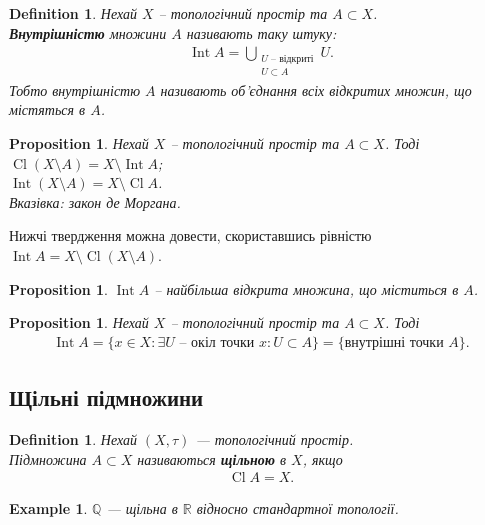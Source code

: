 \documentclass[a4paper, 10pt]{article}
\theoremstyle{theoremdd}
\newtheorem{definition}[theorem]{Definition}
\newtheorem{example}[theorem]{Example}
\newtheorem{proposition}[theorem]{Proposition}
\DeclareMathOperator{\Cl}{Cl}
\DeclareMathOperator{\Int}{Int}
\begin{document}
\begin{definition}
Нехай $X$ -- топологічний простір та $A \subset X$.\\
\textbf{Внутрішністю} множини $A$ називають таку штуку:
\begin{align*}
\Int A = \bigcup_{\substack{\text{$U$ -- відкриті} \\ U \subset A}} U.
\end{align*}
Тобто внутрішністю $A$ називають об'єднання всіх відкритих множин, що містяться в $A$.
\end{definition}

\begin{proposition}
Нехай $X$ -- топологічний простір та $A \subset X$. Тоді\\
$\Cl(X \setminus A) = X \setminus \Int A$;\\
$\Int (X \setminus A) = X \setminus \Cl A$.\\
\textit{Вказівка: закон де Моргана}.
\end{proposition}
\noindent
Нижчі твердження можна довести, скориставшись рівністю $\Int A = X \setminus \Cl (X \setminus A)$.

\begin{proposition}
$\Int A$ -- найбільша відкрита множина, що міститься в $A$.
\end{proposition}

\begin{proposition}
Нехай $X$ -- топологічний простір та $A \subset X$. Тоді
\begin{align*}
\Int A = \{x \in X: \exists \text{$U$ -- окіл точки $x$}: U \subset A\} = \{ \text{внутрішні точки $A$}\}.
\end{align*}
\end{proposition}

\subsection{Щільні підмножини}
\begin{definition}
Нехай $(X,\tau)$ --- топологічний простір.\\
Підмножина $A \subset X$ називаються \textbf{щільною} в $X$, якщо
\begin{align*}
\Cl A = X.
\end{align*} 
\end{definition}

\begin{example}
$\mathbb{Q}$ --- щільна в $\mathbb{R}$ відносно стандартної топології.
\end{example}
\end{document}
